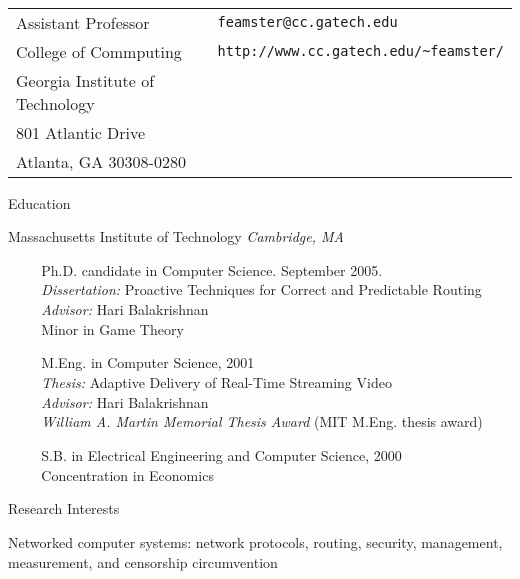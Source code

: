 \documentclass{article}
\begin{document}
\begin{cv}{}

\\

\begin{tabular}{p{3.5in}p{4in}}
\noindent 
Assistant Professor & {\small\tt feamster@cc.gatech.edu} \\
College of Commputing & {\small\tt http://www.cc.gatech.edu/\~{}feamster/} \\
Georgia Institute of Technology  & \\
801 Atlantic Drive & \\
Atlanta, GA 30308-0280 \\
\end{tabular}

\begin{cvlist}{Education}
  \item{} {\sc Massachusetts Institute of Technology}
	\hfill {\em Cambridge, MA}
\item
\verb$    $ Ph.D. candidate in Computer Science.  September 2005. \\
\verb$    $ {\it Dissertation:} Proactive Techniques for Correct and Predictable Routing\\
\verb$    $ {\it Advisor:}  Hari Balakrishnan \\
\verb$    $ Minor in Game Theory

\verb$    $ M.Eng. in Computer Science, 2001\\
\verb$    $ {\it Thesis:} Adaptive Delivery of Real-Time Streaming
Video\\
\verb$    $ {\it Advisor:}  Hari Balakrishnan \\
\verb$    $ {\em William A. Martin Memorial Thesis Award} (MIT M.Eng. thesis award)

\verb$    $ S.B. in Electrical Engineering and Computer Science, 2000\\
\verb$    $ Concentration in Economics

\end{cvlist}

\begin{cvlist}{{Research Interests}}
\item Networked computer systems: network protocols, routing, security,
  management, measurement, and censorship circumvention
\end{cvlist}



\end{cv}
\end{document}
